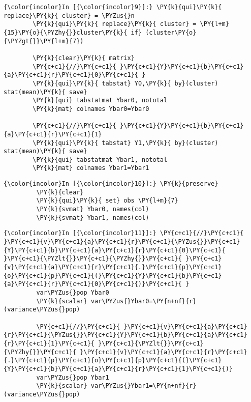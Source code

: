 \documentclass[11pt,notitlepage]{article}\usepackage[]{graphicx}\usepackage[]{color}
\makeatletter
\newenvironment{kframe}{%
 \def\at@end@of@kframe{}%
 \ifinner\ifhmode%
  \def\at@end@of@kframe{\end{minipage}}%
  \begin{minipage}{\columnwidth}%
 \fi\fi%
 \def\FrameCommand##1{\hskip\@totalleftmargin \hskip-\fboxsep
 \colorbox{shadecolor}{##1}\hskip-\fboxsep
     \hskip-\linewidth \hskip-\@totalleftmargin \hskip\columnwidth}%
 \MakeFramed {\advance\hsize-\width
   \@totalleftmargin\z@ \linewidth\hsize
   \@setminipage}}%
 {\par\unskip\endMakeFramed%
 \at@end@of@kframe}
\newenvironment{knitrout}{}{} %
\makeatother
\begin{document}
\begin{enumerate}[a)]
\begin{knitrout}
\color{fgcolor}\begin{kframe}
    \begin{Verbatim}[commandchars=\\\{\}]
{\color{incolor}In [{\color{incolor}9}]:} \PY{k}{qui}\PY{k}{ replace}\PY{k}{ cluster} = \PYZus{}n
        \PY{k}{qui}\PY{k}{ replace}\PY{k}{ cluster} = \PY{l+m}{15}\PY{o}{\PYZhy{}}cluster\PY{k}{ if} (cluster\PY{o}{\PYZgt{}}\PY{l+m}{7})
        
        \PY{k}{clear}\PY{k}{ matrix}
        \PY{c+c1}{//}\PY{c+c1}{ }\PY{c+c1}{Y}\PY{c+c1}{b}\PY{c+c1}{a}\PY{c+c1}{r}\PY{c+c1}{0}\PY{c+c1}{	}
        \PY{k}{qui}\PY{k}{ tabstat} Y0,\PY{k}{ by}(cluster) stat(mean)\PY{k}{ save}
        \PY{k}{qui} tabstatmat Ybar0, nototal
        \PY{k}{mat} colnames Ybar0=Ybar0
        
        \PY{c+c1}{//}\PY{c+c1}{ }\PY{c+c1}{Y}\PY{c+c1}{b}\PY{c+c1}{a}\PY{c+c1}{r}\PY{c+c1}{1}
        \PY{k}{qui}\PY{k}{ tabstat} Y1,\PY{k}{ by}(cluster) stat(mean)\PY{k}{ save}
        \PY{k}{qui} tabstatmat Ybar1, nototal
        \PY{k}{mat} colnames Ybar1=Ybar1
\end{Verbatim}

    \begin{Verbatim}[commandchars=\\\{\}]
{\color{incolor}In [{\color{incolor}10}]:} \PY{k}{preserve} 
         \PY{k}{clear}
         \PY{k}{qui}\PY{k}{ set} obs \PY{l+m}{7}
         \PY{k}{svmat} Ybar0, names(col)
         \PY{k}{svmat} Ybar1, names(col)
\end{Verbatim}
    \begin{Verbatim}[commandchars=\\\{\}]
{\color{incolor}In [{\color{incolor}11}]:} \PY{c+c1}{//}\PY{c+c1}{ }\PY{c+c1}{v}\PY{c+c1}{a}\PY{c+c1}{r}\PY{c+c1}{\PYZus{}}\PY{c+c1}{Y}\PY{c+c1}{b}\PY{c+c1}{a}\PY{c+c1}{r}\PY{c+c1}{0}\PY{c+c1}{ }\PY{c+c1}{\PYZlt{}}\PY{c+c1}{\PYZhy{}}\PY{c+c1}{ }\PY{c+c1}{v}\PY{c+c1}{a}\PY{c+c1}{r}\PY{c+c1}{.}\PY{c+c1}{p}\PY{c+c1}{o}\PY{c+c1}{p}\PY{c+c1}{(}\PY{c+c1}{Y}\PY{c+c1}{b}\PY{c+c1}{a}\PY{c+c1}{r}\PY{c+c1}{0}\PY{c+c1}{)}\PY{c+c1}{	}
         var\PYZus{}pop Ybar0
         \PY{k}{scalar} var\PYZus{}Ybar0=\PY{n+nf}{r}(variance\PYZus{}pop)
         
         \PY{c+c1}{//}\PY{c+c1}{ }\PY{c+c1}{v}\PY{c+c1}{a}\PY{c+c1}{r}\PY{c+c1}{\PYZus{}}\PY{c+c1}{Y}\PY{c+c1}{b}\PY{c+c1}{a}\PY{c+c1}{r}\PY{c+c1}{1}\PY{c+c1}{ }\PY{c+c1}{\PYZlt{}}\PY{c+c1}{\PYZhy{}}\PY{c+c1}{ }\PY{c+c1}{v}\PY{c+c1}{a}\PY{c+c1}{r}\PY{c+c1}{.}\PY{c+c1}{p}\PY{c+c1}{o}\PY{c+c1}{p}\PY{c+c1}{(}\PY{c+c1}{Y}\PY{c+c1}{b}\PY{c+c1}{a}\PY{c+c1}{r}\PY{c+c1}{1}\PY{c+c1}{)}
         var\PYZus{}pop Ybar1
         \PY{k}{scalar} var\PYZus{}Ybar1=\PY{n+nf}{r}(variance\PYZus{}pop)
         

\end{Verbatim}
\end{kframe}
\end{knitrout}
\end{enumerate}
\end{document}
